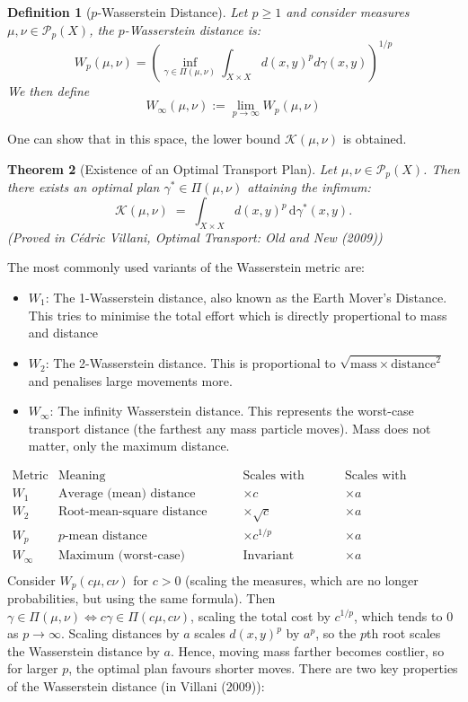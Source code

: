 \documentclass[11pt,a4paper]{article}
\newtheorem{theorem}{Theorem}[section]
\newtheorem{definition}[theorem]{Definition}
\theoremstyle{remark}
\begin{document}
\begin{definition}[$p$-Wasserstein Distance]
Let $p \ge 1$ and consider measures \( \mu, \nu \in \mathcal{P}_p(X) \), the \( p \)-Wasserstein distance is:
\[
W_p(\mu,\nu) = \left(\inf_{\gamma \in \Pi(\mu,\nu)} \int_{X \times X} d(x,y)^p d\gamma(x,y)\right)^{1/p}
\]
We then define \[
W_\infty (\mu, \nu) := \lim \limits _{p \to \infty} W_p (\mu, \nu)
\]
\end{definition}
\noindent One can show that in this space, the lower bound $\mathcal{K}(\mu, \nu)$ is obtained.
\newpage



\begin{theorem}[Existence of an Optimal Transport Plan]
Let $\mu, \nu \in \mathcal{P}_p(X)$. Then there exists an optimal plan $\gamma^*\in\Pi(\mu,\nu)$ attaining the infimum:
\[
\mathcal{K}(\mu,\nu)
\;=\;
\int_{X\times X} d(x,y)^p\,\mathrm{d}\gamma^*(x,y).
\]
(Proved in Cédric Villani, Optimal Transport: Old and New (2009))
\end{theorem}
\noindent
The most commonly used variants of the Wasserstein metric are:
\begin{itemize}
\item \( W_1 \): The 1-Wasserstein distance, also known as the Earth Mover's Distance. This tries to minimise the total effort which is directly propertional to mass and distance 
\item \( W_2 \): The 2-Wasserstein distance. This is proportional to $\sqrt{\text{mass} \times \text{distance}^2}$ and penalises large movements more.
\item \( W_\infty \): The infinity Wasserstein distance. This represents the worst-case transport distance (the farthest any mass particle moves). Mass does not matter, only the maximum distance.
\end{itemize}
\[
\begin{array}{c|c|c|c}
\text{Metric} & \text{Meaning} & \text{Scales with mass} & \text{Scales with distance} \\ \hline
W_1 & \text{Average (mean) distance} & \times c & \times a \\
W_2 & \text{Root-mean-square distance} & \times \sqrt{c} & \times a \\
W_p & \text{\(p\)-mean distance} & \times c^{1/p} & \times a \\
W_\infty & \text{Maximum (worst-case) distance} & \text{Invariant} & \times a \\
\end{array}
\]
Consider $W_p(c\mu, c\nu)$ for $c>0$ (scaling the measures, which are no longer probabilities, but using the same formula). Then $\gamma \in \Pi(\mu,\nu) \iff c\gamma \in \Pi(c\mu,c\nu)$, scaling the total cost by $c^{1/p}$, which tends to $0$ as $p \to \infty$. Scaling distances by $a$ scales $d(x,y)^p$ by $a^p$, so the $p$th root scales the Wasserstein distance by $a$. Hence, moving mass farther becomes costlier, so for larger $p$, the optimal plan favours shorter moves. There are two key properties of the Wasserstein distance (in Villani (2009)):
\end{document}
